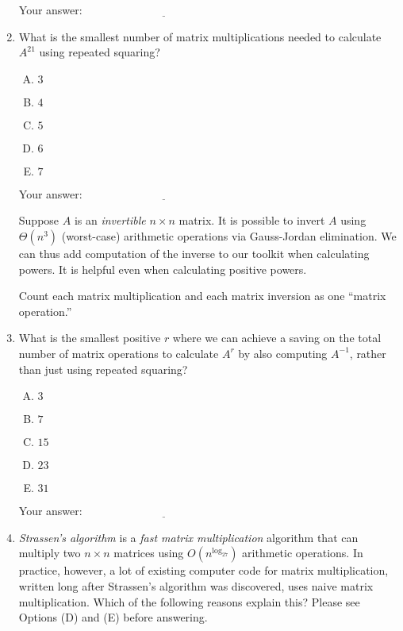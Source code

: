 \documentclass[10pt]{amsart}
\begin{document}
\begin{enumerate}
  \vspace{0.1in}
  Your answer: $\underline{\qquad\qquad\qquad\qquad\qquad\qquad\qquad}$
  \vspace{0.1in}

\item What is the smallest number of matrix multiplications needed to
  calculate $A^{21}$ using repeated squaring?

  \begin{enumerate}[(A)]
  \item $3$
  \item $4$
  \item $5$
  \item $6$
  \item $7$
  \end{enumerate}

  \vspace{0.1in}
  Your answer: $\underline{\qquad\qquad\qquad\qquad\qquad\qquad\qquad}$
  \vspace{0.1in}

  Suppose $A$ is an {\em invertible} $n \times n$ matrix. It is
  possible to invert $A$ using $\Theta(n^3)$ (worst-case) arithmetic
  operations via Gauss-Jordan elimination. We can thus add computation
  of the inverse to our toolkit when calculating powers. It is helpful
  even when calculating positive powers.

  Count each matrix multiplication and each matrix inversion as one
  ``matrix operation.''

\item What is the smallest positive $r$ where we can achieve a saving
  on the total number of matrix operations to calculate $A^r$ by also
  computing $A^{-1}$, rather than just using repeated squaring?

  \begin{enumerate}[(A)]
  \item $3$
  \item $7$
  \item $15$
  \item $23$
  \item $31$
  \end{enumerate}

  \vspace{0.1in}
  Your answer: $\underline{\qquad\qquad\qquad\qquad\qquad\qquad\qquad}$
  \vspace{0.1in}

\item {\em Strassen's algorithm} is a {\em fast matrix multiplication}
  algorithm that can multiply two $n \times n$ matrices using
  $O(n^{\log_27})$ arithmetic operations. In practice, however, a lot
  of existing computer code for matrix multiplication, written long
  after Strassen's algorithm was discovered, uses naive matrix
  multiplication. Which of the following reasons explain this? Please
  see Options (D) and (E) before answering.


\end{enumerate}
\end{document}
